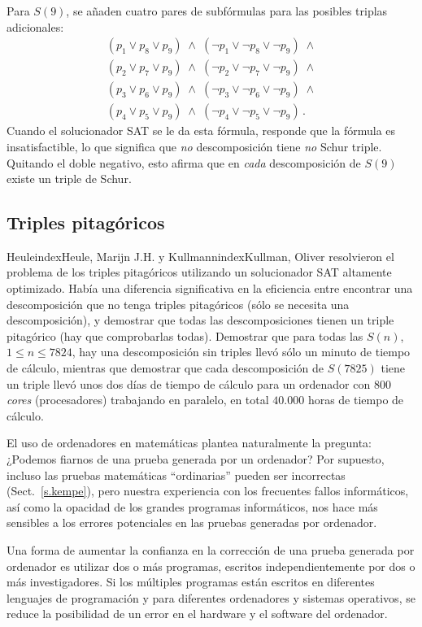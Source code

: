 Para $S(9)$, se añaden cuatro pares de subfórmulas para las posibles triplas adicionales:
\[
\begin{array}{l}
(p_1 \vee p_8 \vee p_9) \;\wedge\; (\neg p_1 \vee \neg p_8 \vee \neg p_9) \;\wedge \\
(p_2 \vee p_7 \vee p_9) \;\wedge\; (\neg p_2 \vee \neg p_7 \vee \neg p_9) \;\wedge \\
(p_3 \vee p_6 \vee p_9) \;\wedge\; (\neg p_3 \vee \neg p_6 \vee \neg p_9) \;\wedge \\
(p_4 \vee p_5 \vee p_9) \;\wedge\; (\neg p_4 \vee \neg p_5 \vee \neg p_9)\,.
\end{array}
\]
Cuando el solucionador SAT se le da esta fórmula, responde que la fórmula es insatisfactible, lo que significa que \emph{no} descomposición tiene \emph{no} Schur triple. Quitando el doble negativo, esto afirma que en \emph{cada} descomposición de $S(9)$ existe un triple de Schur.

\subsection{Triples pitagóricos}

Heuleindex{Heule, Marijn J.H.} y Kullmannindex{Kullman, Oliver} resolvieron el problema de los triples pitagóricos utilizando un solucionador SAT altamente optimizado. Había una diferencia significativa en la eficiencia entre encontrar una descomposición que no tenga triples pitagóricos (sólo se necesita una descomposición), y demostrar que todas las descomposiciones tienen un triple pitagórico (hay que comprobarlas todas). Demostrar que para todas las $S(n)$, $1\leq n\leq 7824$, hay una descomposición sin triples llevó sólo un minuto de tiempo de cálculo, mientras que demostrar que cada descomposición de $S(7825)$ tiene un triple llevó unos dos días de tiempo de cálculo para un ordenador con $800$ \emph{cores} (procesadores) trabajando en paralelo, en total $40.000$ horas de tiempo de cálculo.

El uso de ordenadores en matemáticas plantea naturalmente la pregunta: ¿Podemos fiarnos de una prueba generada por un ordenador? Por supuesto, incluso las pruebas matemáticas ``ordinarias'' pueden ser incorrectas (Sect.~\ref{s.kempe}), pero nuestra experiencia con los frecuentes fallos informáticos, así como la opacidad de los grandes programas informáticos, nos hace más sensibles a los errores potenciales en las pruebas generadas por ordenador.

Una forma de aumentar la confianza en la corrección de una prueba generada por ordenador es utilizar dos o más programas, escritos independientemente por dos o más investigadores. Si los múltiples programas están escritos en diferentes lenguajes de programación y para diferentes ordenadores y sistemas operativos, se reduce la posibilidad de un error en el hardware y el software del ordenador.

